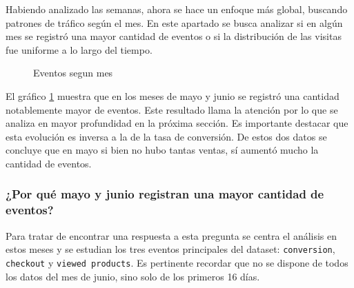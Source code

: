 \documentclass[a4paper]{article}
\begin{document}
Habiendo analizado las semanas, ahora se hace un enfoque más global, buscando patrones de tráfico según el mes. En este apartado se busca analizar si en algún mes se registró una mayor cantidad de eventos o si la distribución de las visitas fue uniforme a lo largo del tiempo.

\begin{figure}[h!]
	\caption{Eventos segun mes}
	\label{fig:mes}
\end{figure}

El gráfico \ref{fig:mes} muestra que en los meses de mayo y junio se registró una cantidad notablemente mayor de eventos. Este resultado llama la atención por lo que se analiza en mayor profundidad en la próxima sección. Es importante destacar que esta evolución es inversa a la de la tasa de conversión. De estos dos datos se concluye que en mayo si bien no hubo tantas ventas, sí aumentó mucho la cantidad de eventos. 

\subsubsection{¿Por qué mayo y junio registran una mayor cantidad de eventos?}

Para tratar de encontrar una respuesta a esta pregunta se centra el análisis en estos meses y se estudian los tres eventos principales del dataset: \texttt{conversion}, \texttt{checkout} y \texttt{viewed products}. Es pertinente recordar que no se dispone de todos los datos del mes de junio, sino solo de los primeros 16 días.
\end{document}
